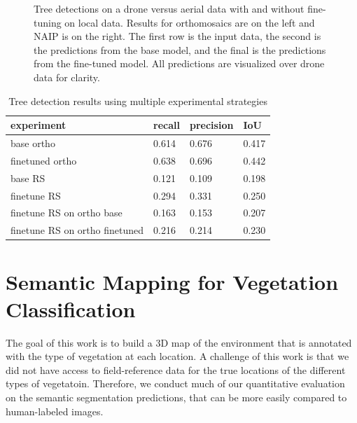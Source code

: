 \begin{figure}[h]
    \hfill
    \caption{Tree detections on a drone versus aerial data with and without fine-tuning on local data. Results for orthomosaics are on the left and NAIP is on the right. The first row is the input data, the second is the predictions from the base model, and the final is the predictions from the fine-tuned model. All predictions are visualized over drone data for clarity.
    }
    \label{fig:results:tree_det}
\end{figure}

\begin{table}[]
    \centering
    \begin{tabular}{|l|l|l|l|}
        \hline
        \textbf{experiment} & \textbf{recall} & \textbf{precision} & \textbf{IoU} \\
        \hline \hline
        base ortho & 0.614 & 0.676 & 0.417\\ \hline 
        finetuned ortho & 0.638 & 0.696 & 0.442\\ \hline 
        base RS & 0.121 & 0.109 & 0.198\\ \hline 
        finetune RS & 0.294 & 0.331 & 0.250\\ \hline 
        finetune RS on ortho base & 0.163 & 0.153 & 0.207\\ \hline 
        finetune RS on ortho finetuned & 0.216 & 0.214 & 0.230\\ \hline 
     \end{tabular}
    \caption{Tree detection results using multiple experimental strategies}
    \label{tab:results:tree_det}
\end{table}



\section{Semantic Mapping for Vegetation Classification}
The goal of this work is to build a 3D map of the environment that is annotated with the type of vegetation at each location. A challenge of this work is that we did not have access to field-reference data for the true locations of the different types of vegetatoin. Therefore, we conduct much of our quantitative evaluation on the semantic segmentation predictions, that can be more easily compared to human-labeled images. 

